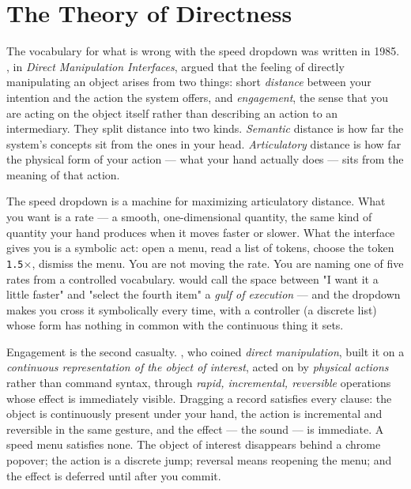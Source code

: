 \documentclass[10pt,letterpaper,twocolumn]{article}
\begin{document}
\section{The Theory of Directness}

The vocabulary for what is wrong with the speed dropdown was written in 1985. \citet{hutchins1985direct}, in \emph{Direct Manipulation Interfaces}, argued that the feeling of directly manipulating an object arises from two things: short \emph{distance} between your intention and the action the system offers, and \emph{engagement}, the sense that you are acting on the object itself rather than describing an action to an intermediary. They split distance into two kinds. \emph{Semantic} distance is how far the system's concepts sit from the ones in your head. \emph{Articulatory} distance is how far the physical form of your action --- what your hand actually does --- sits from the meaning of that action.

The speed dropdown is a machine for maximizing articulatory distance. What you want is a rate --- a smooth, one-dimensional quantity, the same kind of quantity your hand produces when it moves faster or slower. What the interface gives you is a symbolic act: open a menu, read a list of tokens, choose the token \texttt{1.5$\times$}, dismiss the menu. You are not moving the rate. You are naming one of five rates from a controlled vocabulary. \citet{norman1988everyday} would call the space between "I want it a little faster" and "select the fourth item" a \emph{gulf of execution} --- and the dropdown makes you cross it symbolically every time, with a controller (a discrete list) whose form has nothing in common with the continuous thing it sets.

Engagement is the second casualty. \citet{shneiderman1983direct}, who coined \emph{direct manipulation}, built it on a \emph{continuous representation of the object of interest}, acted on by \emph{physical actions} rather than command syntax, through \emph{rapid, incremental, reversible} operations whose effect is immediately visible. Dragging a record satisfies every clause: the object is continuously present under your hand, the action is incremental and reversible in the same gesture, and the effect --- the sound --- is immediate. A speed menu satisfies none. The object of interest disappears behind a chrome popover; the action is a discrete jump; reversal means reopening the menu; and the effect is deferred until after you commit.
\end{document}
